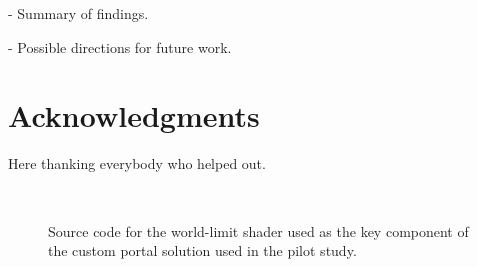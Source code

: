 \documentclass{sigchi}
\begin{document}
- Summary of findings.

- Possible directions for future work.

\section{Acknowledgments}

Here thanking everybody who helped out.

\begin{figure}

  \caption{Source code for the world-limit shader used as the key component of the custom portal solution used in the pilot study.}~\label{lst:worldLimitShader}
\end{figure}


%
%
%
%
%
\balance{}



\end{document}
